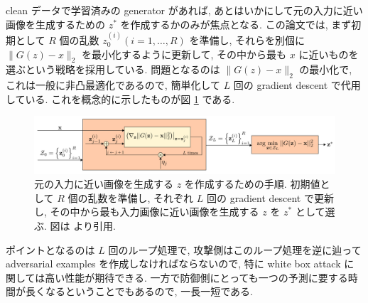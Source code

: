 clean データで学習済みの generator があれば, あとはいかにして元の入力に近い画像を生成するための $z^*$ を作成するかのみが焦点となる.
この論文では, まず初期として $R$ 個の乱数 $z_0^{(i)} (i = 1, \dots, R)$ を準備し, それらを別個に $\| G(z) - x \|_2$ を最小化するように更新して, その中から最も $x$ に近いものを選ぶという戦略を採用している.
問題となるのは $\| G(z) - x \|_2$ の最小化で, これは一般に非凸最適化であるので, 簡単化して $L$ 回の gradient descent で代用している.
これを概念的に示したものが図 \ref{fig:defense-gan-z-optimization} である.
%
\begin{figure}[htbp]
\begin{center}
\includegraphics[width=14.0cm]{figures/defense-gan-z-optimization.pdf}
\end{center}
\caption{
元の入力に近い画像を生成する $z$ を作成するための手順.
初期値として $R$ 個の乱数を準備し, それぞれ $L$ 回の gradient descent で更新し, その中から最も入力画像に近い画像を生成する $z$ を $z^*$ として選ぶ.
図は \cite{samangouei2018defense} より引用.
}
\label{fig:defense-gan-z-optimization}
\end{figure}
%
ポイントとなるのは $L$ 回のループ処理で, 攻撃側はこのループ処理を逆に辿って adversarial examples を作成しなければならないので, 特に white box attack に関しては高い性能が期待できる.
一方で防御側にとっても一つの予測に要する時間が長くなるということでもあるので, 一長一短である.

